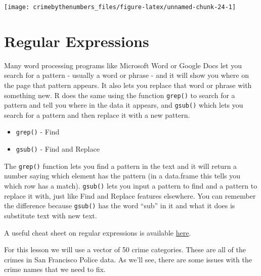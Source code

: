 \documentclass[
  12pt,
]{book}
\providecommand{\tightlist}{%
  \setlength{\itemsep}{0pt}\setlength{\parskip}{0pt}}
\begin{document}
\begin{center}\texttt{[image: crimebythenumbers\_files/figure-latex/unnamed-chunk-24-1]} \end{center}

\hypertarget{regular-expressions}{%
\chapter{Regular Expressions}\label{regular-expressions}}

Many word processing programs like Microsoft Word or Google Docs let you search for a pattern - usually a word or phrase - and it will show you where on the page that pattern appears. It also lets you replace that word or phrase with something new. R does the same using the function \texttt{grep()} to search for a pattern and tell you where in the data it appears, and \texttt{gsub()} which lets you search for a pattern and then replace it with a new pattern.

\begin{itemize}
\tightlist
\item
  \texttt{grep()} - Find
\item
  \texttt{gsub()} - Find and Replace
\end{itemize}

The \texttt{grep()} function lets you find a pattern in the text and it will return a number saying which element has the pattern (in a data.frame this tells you which row has a match). \texttt{gsub()} lets you input a pattern to find and a pattern to replace it with, just like Find and Replace features elsewhere. You can remember the difference because \texttt{gsub()} has the word ``sub'' in it and what it does is substitute text with new text.

A useful cheat sheet on regular expressions is available \href{https://www.rstudio.com/wp-content/uploads/2016/09/RegExCheatsheet.pdf}{here}.

For this lesson we will use a vector of 50 crime categories. These are all of the crimes in San Francisco Police data. As we'll see, there are some issues with the crime names that we need to fix.
\end{document}
